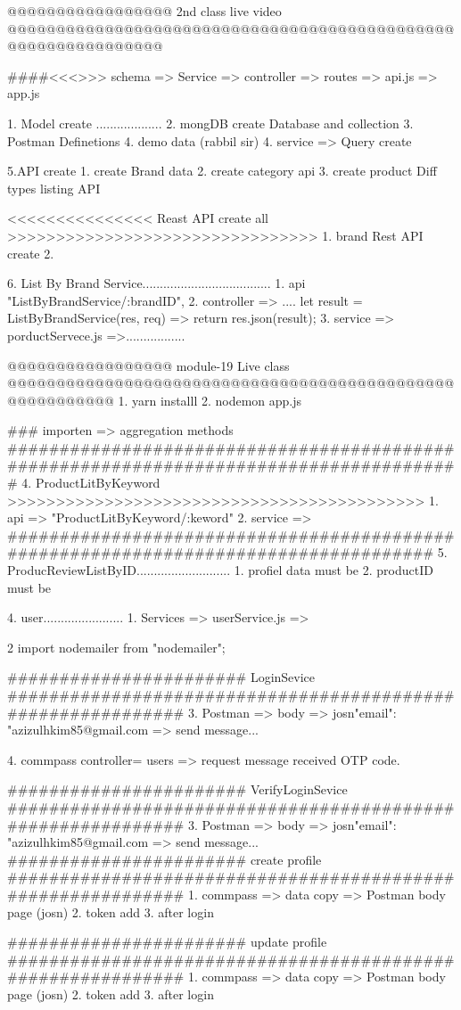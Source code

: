 @@@@@@@@@@@@@@@@@ 2nd class live video @@@@@@@@@@@@@@@@@@@@@@@@@@@@@@@@@@@@@@@@@@@@@@@@@@@@@@@@@@@@@@

####<<<>>> schema => Service => controller => routes => api.js => app.js

1. Model create ...................
2. mongDB create Database and collection 
3. Postman Definetions
4. demo data (rabbil sir)
4. service => Query create 

5.API create 
   1. create Brand data 
   2. create category api 
   3. create product Diff types listing API



<<<<<<<<<<<<<<< Reast API create all >>>>>>>>>>>>>>>>>>>>>>>>>>>>>>>>
1. brand Rest API create 
2.

6. List By Brand Service.....................................
   1. api "ListByBrandService/:brandID", 
   2. controller => ....
       let result = ListByBrandService(res, req) => {
        return res.json(result);
       }
   3. service => porductServece.js =>.................
      


@@@@@@@@@@@@@@@@@ module-19 Live class @@@@@@@@@@@@@@@@@@@@@@@@@@@@@@@@@@@@@@@@@@@@@@@@@@@@@@@@@
1. yarn installl 
2. nodemon app.js

### importen => aggregation methods 
#######################################################################################
4. ProductLitByKeyword >>>>>>>>>>>>>>>>>>>>>>>>>>>>>>>>>>>>>>>>>>>
   1. api => "ProductLitByKeyword/:keword"
   2. service => 
####################################################################################
5. ProducReviewListByID...........................
   1. profiel data must be 
   2. productID must be 

4. user.......................
   1. Services => userService.js => 

   2 import nodemailer from "nodemailer";

   

####################### LoginSevice ############################################################
   3. Postman => body => josn{"email": "azizulhkim85@gmail.com} 
      => send message...

   4. commpass controller= users => request message received OTP code.

####################### VerifyLoginSevice ############################################################
3. Postman => body => josn{"email": "azizulhkim85@gmail.com} 
           => send message...
####################### create profile ############################################################
1. commpass => data copy => Postman body page (josn)
2. token add 
3. after login 

####################### update profile ############################################################
1. commpass => data copy => Postman body page (josn)
2. token add 
3. after login 